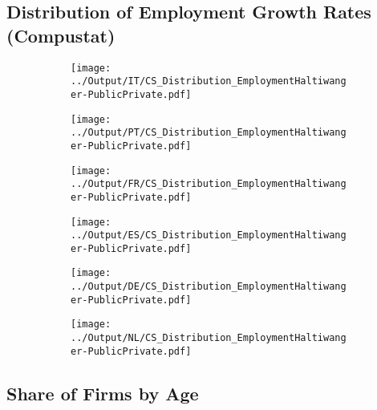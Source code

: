 \documentclass[12pt,notitlepage]{article}
\begin{document}
\subsection{Distribution of Employment Growth Rates (Compustat)}
\begin{figure}[!htpb]
\centering
\begin{subfigure}{.49\textwidth}
    \centering
 \texttt{[image: ../Output/IT/CS\_Distribution\_EmploymentHaltiwanger-PublicPrivate.pdf]}
\end{subfigure}%
\begin{subfigure}{.49\textwidth}
    \centering
 \texttt{[image: ../Output/PT/CS\_Distribution\_EmploymentHaltiwanger-PublicPrivate.pdf]}
\end{subfigure}
\begin{subfigure}{.49\textwidth}
    \centering
 \texttt{[image: ../Output/FR/CS\_Distribution\_EmploymentHaltiwanger-PublicPrivate.pdf]}
\end{subfigure}%
\begin{subfigure}{.49\textwidth}
    \centering
 \texttt{[image: ../Output/ES/CS\_Distribution\_EmploymentHaltiwanger-PublicPrivate.pdf]}
\end{subfigure}
\begin{subfigure}{.49\textwidth}
    \centering
 \texttt{[image: ../Output/DE/CS\_Distribution\_EmploymentHaltiwanger-PublicPrivate.pdf]}
\end{subfigure}
\begin{subfigure}{.49\textwidth}
    \centering
 \texttt{[image: ../Output/NL/CS\_Distribution\_EmploymentHaltiwanger-PublicPrivate.pdf]}
\end{subfigure}
\end{figure}

\clearpage


\subsection{Share of Firms by Age}
\end{document}

